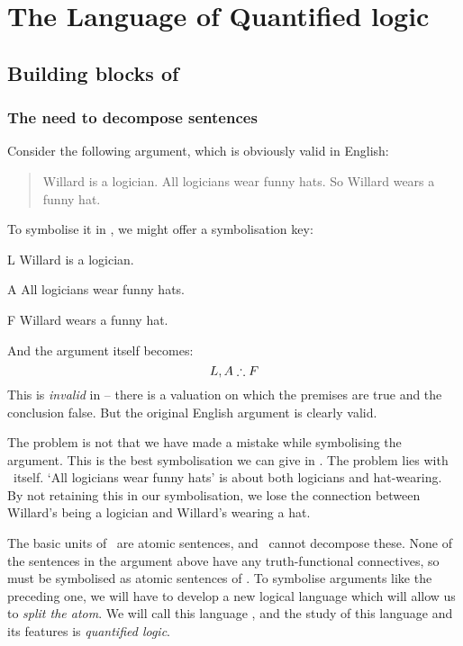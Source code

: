 \part{The Language of Quantified logic}
\label{ch.FOL}
\chapter{Building blocks of \textnormal{\FOL}}\label{s:FOLBuildingBlocks}
\section{The need to decompose sentences}
Consider the following argument, which is obviously valid in English:
\begin{quote}
\label{willard1}
Willard is a logician. All logicians wear funny hats. So Willard wears a funny hat.
\end{quote}
To symbolise it in \TFL, we might offer a symbolisation key:
\begin{ekey}
\item[L] Willard is a logician.
\item[A] All logicians wear funny hats.
\item[F] Willard wears a funny hat.
\end{ekey}
And the argument itself becomes:
$$L, A \mathrel{\therefore} F$$
This is \emph{invalid} in \TFL – there is a valuation on which the premises are true and the conclusion false. But the original English argument is clearly valid.

The problem is not that we have made a mistake while symbolising the argument. This is the best symbolisation we can give in \TFL. The problem lies with \TFL\ itself. `All logicians wear funny hats' is about both logicians and hat-wearing. By not retaining this in our symbolisation, we lose the connection between Willard's being a logician and Willard's wearing a hat.

The basic units of \TFL\ are atomic sentences, and \TFL\ cannot decompose these. None of the sentences in the argument above have any truth-functional connectives, so must be symbolised as atomic sentences of \TFL. To symbolise arguments like the preceding one, we will have to develop a new logical language which will allow us to \emph{split the atom}. We will call this language \FOL, and the study of this language and its features is \emph{quantified logic}. 

